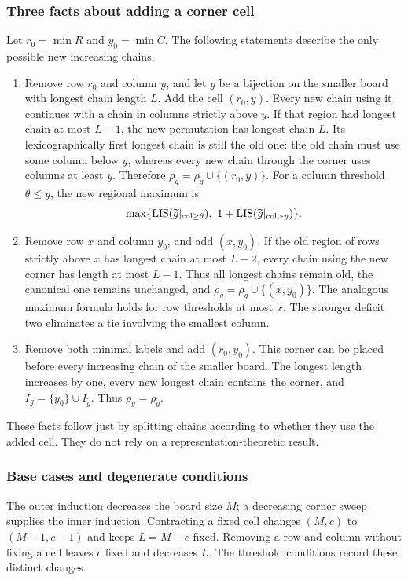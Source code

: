 \documentclass[11pt,a4paper]{article}
\theoremstyle{definition}\newtheorem{definition}[theorem]{Definition}
\theoremstyle{remark}\newtheorem{remark}[theorem]{Remark}
\begin{document}
\subsubsection{Three facts about adding a corner cell}
Let $r_0=\min R$ and $y_0=\min C$. The following statements describe the only possible new increasing chains.
\begin{enumerate}
\item Remove row $r_0$ and column $y$, and let $\widetilde g$ be a bijection on the smaller board with longest chain length $L$. Add the cell $(r_0,y)$. Every new chain using it continues with a chain in columns strictly above $y$. If that region had longest chain at most $L-1$, the new permutation has longest chain $L$. Its lexicographically first longest chain is still the old one: the old chain must use some column below $y$, whereas every new chain through the corner uses columns at least $y$. Therefore $\rho_g=\rho_{\widetilde g}\cup\{(r_0,y)\}$. For a column threshold $\theta\le y$, the new regional maximum is
\[\max\{\operatorname{LIS}(\widetilde g|_{\mathrm{col}\ge\theta}),\ 1+\operatorname{LIS}(\widetilde g|_{\mathrm{col}>y})\}.
\]
\item Remove row $x$ and column $y_0$, and add $(x,y_0)$. If the old region of rows strictly above $x$ has longest chain at most $L-2$, every chain using the new corner has length at most $L-1$. Thus all longest chains remain old, the canonical one remains unchanged, and $\rho_g=\rho_{\widetilde g}\cup\{(x,y_0)\}$. The analogous maximum formula holds for row thresholds at most $x$. The stronger deficit two eliminates a tie involving the smallest column.
\item Remove both minimal labels and add $(r_0,y_0)$. This corner can be placed before every increasing chain of the smaller board. The longest length increases by one, every new longest chain contains the corner, and $I_g=\{y_0\}\cup I_{\widetilde g}$. Thus $\rho_g=\rho_{\widetilde g}$.
\end{enumerate}
These facts follow just by splitting chains according to whether they use the added cell. They do not rely on a representation-theoretic result.

\subsubsection{Base cases and degenerate conditions}
The outer induction decreases the board size $M$; a decreasing corner
sweep supplies the inner induction. Contracting a fixed cell changes
$(M,c)$ to $(M-1,c-1)$ and keeps $L=M-c$ fixed. Removing a row and
column without fixing a cell leaves $c$ fixed and decreases $L$.
The threshold conditions record these distinct changes.
\end{document}
